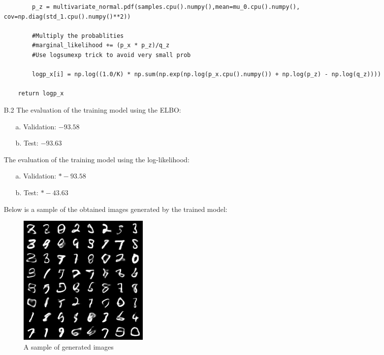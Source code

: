 \begin{itemize}
\begin{lstlisting}
		p_z = multivariate_normal.pdf(samples.cpu().numpy(),mean=mu_0.cpu().numpy(), cov=np.diag(std_1.cpu().numpy()**2))

		#Multiply the probablities
		#marginal_likelihood += (p_x * p_z)/q_z
		#Use logsumexp trick to avoid very small prob
		
		logp_x[i] = np.log((1.0/K) * np.sum(np.exp(np.log(p_x.cpu().numpy()) + np.log(p_z) - np.log(q_z))))

	return logp_x
     \end{lstlisting}
     \item[B.2]
     The evaluation of the training model using the ELBO:
     \begin{itemize}
         \item [a.] Validation: $-93.58$
         \item [b.] Test: $-93.63$
     \end{itemize}
     The evaluation of the training model using the log-likelihood:
     \begin{itemize}
         \item [a.] Validation: $*-93.58$
         \item [b.] Test: $*-43.63$
     \end{itemize}
     Below is a sample of the obtained images generated by the trained model:
\begin{figure}
  \includegraphics[width=\linewidth]{sample_19.png}
  \caption{A sample of generated images}
  \label{fig:gen_sample}
\end{figure}
\end{itemize}
